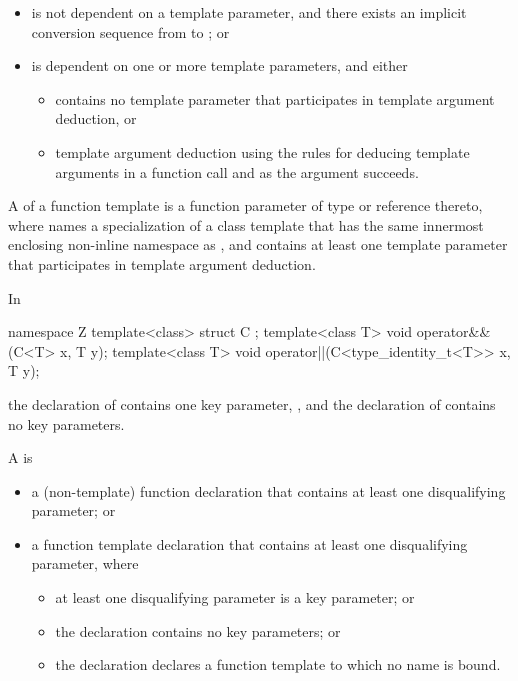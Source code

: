 \begin{itemize}
\item
is not dependent on a template parameter, and
there exists an implicit conversion sequence
from  to ; or

\item
is dependent on one or more template parameters, and either
\begin{itemize}
\item
{} contains no template parameter that
participates in template argument deduction, or
\item
template argument deduction
using the rules for deducing template arguments
in a function call and
 as the argument succeeds.
\end{itemize}
\end{itemize}

\pnum
{}%
A  of a function template 
is a function parameter of type \cv{}  or reference thereto,
where  names a specialization of a class template that
has the same innermost enclosing non-inline namespace as , and
 contains at least one template parameter that
participates in template argument deduction.
\begin{example}
In
\begin{codeblock}
namespace Z {
  template<class> struct C {};
  template<class T>
    void operator&&(C<T> x, T y);
  template<class T>
    void operator||(C<type_identity_t<T>> x, T y);
}
\end{codeblock}
the declaration of 
contains one key parameter, , and
the declaration of 
contains no key parameters.
\end{example}

\pnum
A  is

\begin{itemize}
\item
a (non-template) function declaration that
contains at least one disqualifying parameter; or

\item
a function template declaration that
contains at least one disqualifying parameter, where
\begin{itemize}
\item at least one disqualifying parameter is a key parameter; or
\item the declaration contains no key parameters; or
\item the declaration declares a function template
to which no name is bound.
\end{itemize}
\end{itemize}

